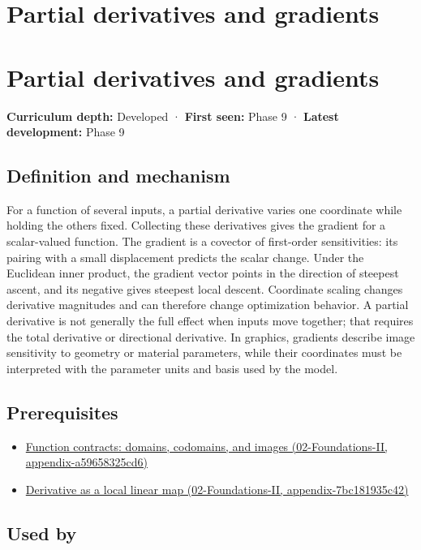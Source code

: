 \hypertarget{appendix-677b59746ae0}{}
\section*{Partial derivatives and gradients}
\section{Partial derivatives and gradients}\label{partial-derivatives-and-gradients}

\textbf{Curriculum depth:} Developed · \textbf{First seen:} Phase 9 · \textbf{Latest development:} Phase 9

\subsection{Definition and mechanism}\label{definition-and-mechanism}

For a function of several inputs, a partial derivative varies one coordinate while holding the others fixed. Collecting these derivatives gives the gradient for a scalar-valued function. The gradient is a covector of first-order sensitivities: its pairing with a small displacement predicts the scalar change. Under the Euclidean inner product, the gradient vector points in the direction of steepest ascent, and its negative gives steepest local descent. Coordinate scaling changes derivative magnitudes and can therefore change optimization behavior. A partial derivative is not generally the full effect when inputs move together; that requires the total derivative or directional derivative. In graphics, gradients describe image sensitivity to geometry or material parameters, while their coordinates must be interpreted with the parameter units and basis used by the model.

\subsection{Prerequisites}\label{prerequisites}

\begin{itemize}
\tightlist
\item
  \href{}{Function contracts: domains, codomains, and images (02-Foundations-II, appendix-a59658325cd6)}
\item
  \href{}{Derivative as a local linear map (02-Foundations-II, appendix-7bc181935c42)}
\end{itemize}

\subsection{Used by}\label{used-by}

